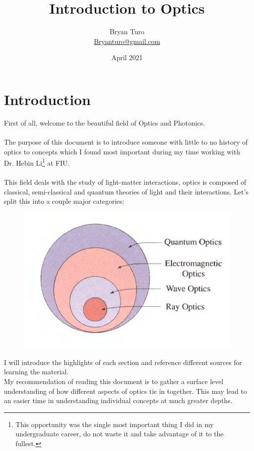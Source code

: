 \documentclass{article}
\title{Introduction to Optics}
\author{Bryan Turo\\ \href{mailto:bryanturo@gmail.com}{Bryanturo@gmail.com} }
\date{April 2021}
\begin{document}
\maketitle

\tableofcontents

\newpage


\section{Introduction}
First of all, welcome to the beautiful field of Optics and Photonics.
\\
\
\\
The purpose of this document is to introduce someone with little to no history of optics to concepts which I found most important during my time working with Dr. Hebin Li\footnote{This opportunity was the single most important thing I did in my undergraduate career, do not waste it and take advantage of it to the fullest.} at FIU.
\\
\ 
\\
This field deals with the study of light-matter interactions, optics is composed of classical, semi-classical and quantum theories of light and their interactions. Let's split this into a couple major categories:
\begin{figure}[!phtb]
    \centering
    \includegraphics[width=0.75\linewidth]{img/categories.eps}
    \label{fig:categories}
\end{figure}

I will introduce the highlights of each section and reference different sources for learning the material.
\\
My recommendation of reading this document is to gather a surface level understanding of how different aspects of optics tie in together. This may lead to an easier time in understanding individual concepts at much greater depths.
\end{document}
